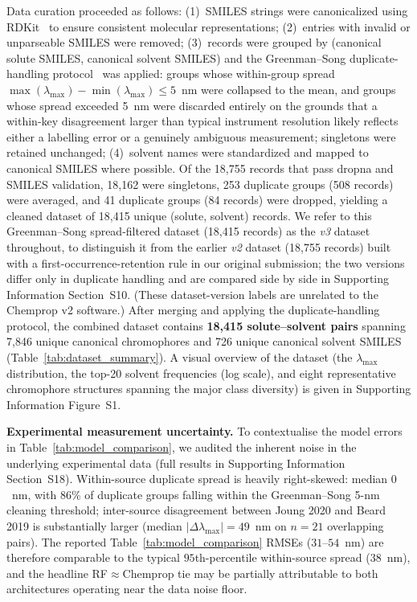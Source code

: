 \documentclass[journal=jcisd8,manuscript=article]{achemso}
\begin{document}
Data curation proceeded as follows: (1)~SMILES strings were canonicalized using RDKit~\cite{landrumRdkitRdkit2020_03_12020} to ensure consistent molecular representations; (2)~entries with invalid or unparseable SMILES were removed; (3)~records were grouped by (canonical solute SMILES, canonical solvent SMILES) and the Greenman--Song duplicate-handling protocol~\cite{greenman2022multifidelity,song2025fluortools} was applied: groups whose within-group spread $\max(\lambda_{\max}) - \min(\lambda_{\max}) \leq 5$~nm were collapsed to the mean, and groups whose spread exceeded 5~nm were discarded entirely on the grounds that a within-key disagreement larger than typical instrument resolution likely reflects either a labelling error or a genuinely ambiguous measurement; singletons were retained unchanged; (4)~solvent names were standardized and mapped to canonical SMILES where possible. Of the 18{,}755 records that pass dropna and SMILES validation, 18{,}162 were singletons, 253 duplicate groups (508 records) were averaged, and 41 duplicate groups (84 records) were dropped, yielding a cleaned dataset of 18{,}415 unique (solute, solvent) records. We refer to this Greenman--Song spread-filtered dataset (18{,}415 records) as the \emph{v3} dataset throughout, to distinguish it from the earlier \emph{v2} dataset (18{,}755 records) built with a first-occurrence-retention rule in our original submission; the two versions differ only in duplicate handling and are compared side by side in Supporting Information Section~S10. (These dataset-version labels are unrelated to the Chemprop v2 software.)
After merging and applying the duplicate-handling protocol, the combined dataset contains \textbf{18,415 solute--solvent pairs} spanning 7,846 unique canonical chromophores and 726 unique canonical solvent SMILES (Table~\ref{tab:dataset_summary}). A visual overview of the dataset (the $\lambda_{\max}$ distribution, the top-20 solvent frequencies (log scale), and eight representative chromophore structures spanning the major class diversity) is given in Supporting Information Figure~S1.

\textbf{Experimental measurement uncertainty.} To contextualise the model errors in Table~\ref{tab:model_comparison}, we audited the inherent noise in the underlying experimental data (full results in Supporting Information Section~S18). Within-source duplicate spread is heavily right-skewed: median $0$~nm, with $86$\% of duplicate groups falling within the Greenman--Song 5-nm cleaning threshold; inter-source disagreement between Joung 2020 and Beard 2019 is substantially larger (median $|\Delta\lambda_{\max}| = 49$~nm on $n = 21$ overlapping pairs). The reported Table~\ref{tab:model_comparison} RMSEs ($31$--$54$~nm) are therefore comparable to the typical $95$th-percentile within-source spread ($38$~nm), and the headline RF$\approx$Chemprop tie may be partially attributable to both architectures operating near the data noise floor.
\end{document}
